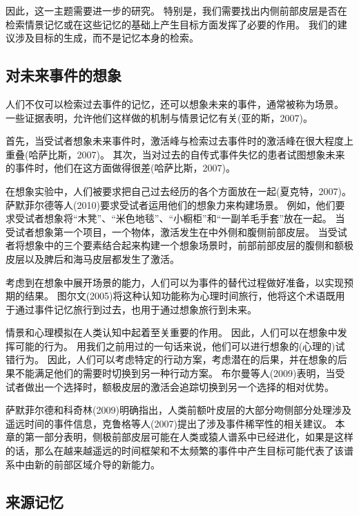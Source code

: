 因此，这一主题需要进一步的研究。
特别是，我们需要找出内侧前部皮层是否在检索情景记忆或在这些记忆的基础上产生目标方面发挥了必要的作用。
我们的建议涉及目标的生成，而不是记忆本身的检索。
\par



\subsection{对未来事件的想象}
\par
人们不仅可以检索过去事件的记忆，还可以想象未来的事件，通常被称为场景。
一些证据表明，允许他们这样做的机制与情景记忆有关(亚的斯，2007)。


首先，当受试者想象未来事件时，激活峰与检索过去事件时的激活峰在很大程度上重叠(哈萨比斯，2007)。
其次，当对过去的自传式事件失忆的患者试图想象未来的事件时，他们在这方面做得很差(哈萨比斯，2007)。


在想象实验中，人们被要求把自己过去经历的各个方面放在一起(夏克特，2007)。
萨默菲尔德等人(2010)要求受试者运用他们的想象力来构建场景。
例如，他们要求受试者想象将“木凳”、“米色地毯”、“小橱柜”和“一副羊毛手套”放在一起。
当受试者想象第一个项目，一个物体，激活发生在中外侧和腹侧前部皮层。
当受试者将想象中的三个要素结合起来构建一个想象场景时，前部前部皮层的腹侧和额极皮层以及脾后和海马皮层都发生了激活。


考虑到在想象中展开场景的能力，人们可以为事件的替代过程做好准备，以实现预期的结果。
图尔文(2005)将这种认知功能称为心理时间旅行，他将这个术语既用于通过事件记忆旅行到过去，也用于通过想象旅行到未来。


情景和心理模拟在人类认知中起着至关重要的作用。
因此，人们可以在想象中发挥可能的行为。
用我们之前用过的一句话来说，他们可以进行想象的(心理的)试错行为。
因此，人们可以考虑特定的行动方案，考虑潜在的后果，并在想象的后果不能满足他们的需要时切换到另一种行动方案。
布尔曼等人(2009)表明，当受试者做出一个选择时，额极皮层的激活会追踪切换到另一个选择的相对优势。


萨默菲尔德和科奇林(2009)明确指出，人类前额叶皮层的大部分吻侧部分处理涉及遥远时间的事件信息，克鲁格等人(2007)提出了涉及事件稀罕性的相关建议。
本章的第一部分表明，侧极前部皮层可能在人类或猿人谱系中已经进化，如果是这样的话，那么在越来越遥远的时间框架和不太频繁的事件中产生目标可能代表了该谱系中由新的前部区域介导的新能力。



\subsection{来源记忆}

